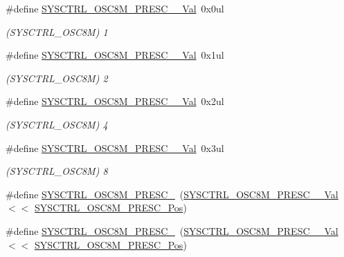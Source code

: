 \begin{DoxyCompactItemize}
\item 
\#define \mbox{\hyperlink{group___s_a_m_d21___s_y_s_c_t_r_l_ga43491f1bb5e580843e0c66a7148b2f15}{S\+Y\+S\+C\+T\+R\+L\+\_\+\+O\+S\+C8\+M\+\_\+\+P\+R\+E\+S\+C\+\_\+\_\+\+Val}}~0x0ul
\begin{DoxyCompactList}\small\item\em (S\+Y\+S\+C\+T\+R\+L\+\_\+\+O\+S\+C8M) 1 \end{DoxyCompactList}\item 
\#define \mbox{\hyperlink{group___s_a_m_d21___s_y_s_c_t_r_l_ga4728c12fffb90a425c9827fc8e7f7460}{S\+Y\+S\+C\+T\+R\+L\+\_\+\+O\+S\+C8\+M\+\_\+\+P\+R\+E\+S\+C\+\_\+\_\+\+Val}}~0x1ul
\begin{DoxyCompactList}\small\item\em (S\+Y\+S\+C\+T\+R\+L\+\_\+\+O\+S\+C8M) 2 \end{DoxyCompactList}\item 
\#define \mbox{\hyperlink{group___s_a_m_d21___s_y_s_c_t_r_l_ga0261bc5625974b1fe782548a9c01eb0b}{S\+Y\+S\+C\+T\+R\+L\+\_\+\+O\+S\+C8\+M\+\_\+\+P\+R\+E\+S\+C\+\_\+\_\+\+Val}}~0x2ul
\begin{DoxyCompactList}\small\item\em (S\+Y\+S\+C\+T\+R\+L\+\_\+\+O\+S\+C8M) 4 \end{DoxyCompactList}\item 
\#define \mbox{\hyperlink{group___s_a_m_d21___s_y_s_c_t_r_l_ga0c6779a9ce1a0206cd16fa70f867f058}{S\+Y\+S\+C\+T\+R\+L\+\_\+\+O\+S\+C8\+M\+\_\+\+P\+R\+E\+S\+C\+\_\+\_\+\+Val}}~0x3ul
\begin{DoxyCompactList}\small\item\em (S\+Y\+S\+C\+T\+R\+L\+\_\+\+O\+S\+C8M) 8 \end{DoxyCompactList}\item 
\#define \mbox{\hyperlink{group___s_a_m_d21___s_y_s_c_t_r_l_ga561194ef7e32ffd3b8badf615b9ddf93}{S\+Y\+S\+C\+T\+R\+L\+\_\+\+O\+S\+C8\+M\+\_\+\+P\+R\+E\+S\+C\+\_}}~(\mbox{\hyperlink{group___s_a_m_d21___s_y_s_c_t_r_l_ga43491f1bb5e580843e0c66a7148b2f15}{S\+Y\+S\+C\+T\+R\+L\+\_\+\+O\+S\+C8\+M\+\_\+\+P\+R\+E\+S\+C\+\_\+\_\+\+Val}}     $<$$<$ \mbox{\hyperlink{group___s_a_m_d21___s_y_s_c_t_r_l_gaaafcd541bd6a395901ec3232e063988d}{S\+Y\+S\+C\+T\+R\+L\+\_\+\+O\+S\+C8\+M\+\_\+\+P\+R\+E\+S\+C\+\_\+\+Pos}})
\item 
\#define \mbox{\hyperlink{group___s_a_m_d21___s_y_s_c_t_r_l_ga6f816aa550075c2aeaacb8a6f6af1333}{S\+Y\+S\+C\+T\+R\+L\+\_\+\+O\+S\+C8\+M\+\_\+\+P\+R\+E\+S\+C\+\_}}~(\mbox{\hyperlink{group___s_a_m_d21___s_y_s_c_t_r_l_ga4728c12fffb90a425c9827fc8e7f7460}{S\+Y\+S\+C\+T\+R\+L\+\_\+\+O\+S\+C8\+M\+\_\+\+P\+R\+E\+S\+C\+\_\+\_\+\+Val}}     $<$$<$ \mbox{\hyperlink{group___s_a_m_d21___s_y_s_c_t_r_l_gaaafcd541bd6a395901ec3232e063988d}{S\+Y\+S\+C\+T\+R\+L\+\_\+\+O\+S\+C8\+M\+\_\+\+P\+R\+E\+S\+C\+\_\+\+Pos}})

\end{DoxyCompactItemize}
